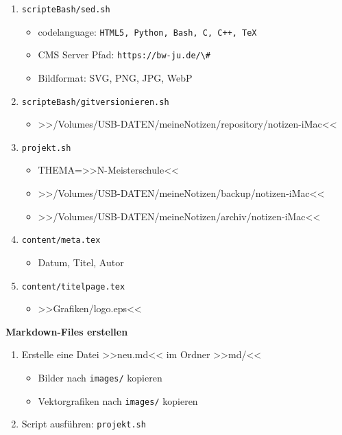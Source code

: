 \begin{enumerate}
\item
  \verb|scripteBash/sed.sh|

  \begin{itemize}
  \item
    codelanguage:
    \verb|HTML5, Python, Bash, C, C++, TeX|
  \item
    CMS Server Pfad: \verb|https://bw-ju.de/\#|
  \item
    Bildformat: SVG, PNG, JPG, WebP
  \end{itemize}
\item
  \verb|scripteBash/gitversionieren.sh|

  \begin{itemize}
  \item
    >>/Volumes/USB-DATEN/meineNotizen/repository/notizen-iMac<<
  \end{itemize}
\item
  \verb|projekt.sh|

  \begin{itemize}
  \item
    THEMA=>>N-Meisterschule<<
  \item
    >>/Volumes/USB-DATEN/meineNotizen/backup/notizen-iMac<<
  \item
    >>/Volumes/USB-DATEN/meineNotizen/archiv/notizen-iMac<<
  \end{itemize}
\item
  \verb|content/meta.tex|

  \begin{itemize}
  \item
    Datum, Titel, Autor
  \end{itemize}
\item
  \verb|content/titelpage.tex|

  \begin{itemize}
  \item
    >>Grafiken/logo.eps<<
  \end{itemize}
\end{enumerate}

\textbf{Markdown-Files erstellen}

\begin{enumerate}
\item
  Erstelle eine Datei >>neu.md<< im Ordner >>md/<<

  \begin{itemize}
  \item
    Bilder nach \verb|images/| kopieren
  \item
    Vektorgrafiken nach \verb|images/| kopieren
  \end{itemize}
\item
  Script ausführen: \verb|projekt.sh|
\end{enumerate}

